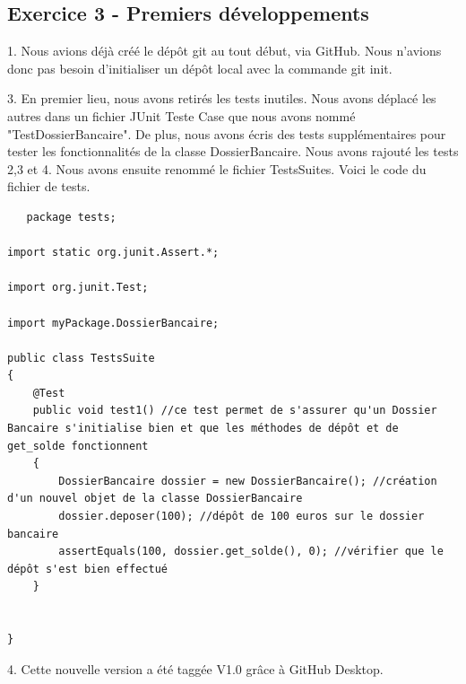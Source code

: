 \documentclass{article}
\begin{document}
\subsection{Exercice 3 - Premiers développements}
1. Nous avions déjà créé le dépôt git au tout début, via GitHub. Nous n'avions donc pas besoin d'initialiser un dépôt local avec la commande git init.

3.
En premier lieu, nous avons retirés les tests inutiles. Nous avons déplacé les autres dans un fichier JUnit Teste Case que nous avons nommé "TestDossierBancaire". De plus, nous avons écris des tests supplémentaires pour tester les fonctionnalités de la classe DossierBancaire. Nous avons rajouté les tests 2,3 et 4. Nous avons ensuite renommé le fichier TestsSuites.
Voici le code du fichier de tests.

\begin{lstlisting}
   package tests;

import static org.junit.Assert.*;

import org.junit.Test;

import myPackage.DossierBancaire;

public class TestsSuite
{
	@Test  
	public void test1() //ce test permet de s'assurer qu'un Dossier Bancaire s'initialise bien et que les méthodes de dépôt et de get_solde fonctionnent
	{
		DossierBancaire dossier = new DossierBancaire(); //création d'un nouvel objet de la classe DossierBancaire
		dossier.deposer(100); //dépôt de 100 euros sur le dossier bancaire
		assertEquals(100, dossier.get_solde(), 0); //vérifier que le dépôt s'est bien effectué
	}
	
	
}
\end{lstlisting}
4.
Cette nouvelle version a été taggée V1.0 grâce à GitHub Desktop.
\end{document}
